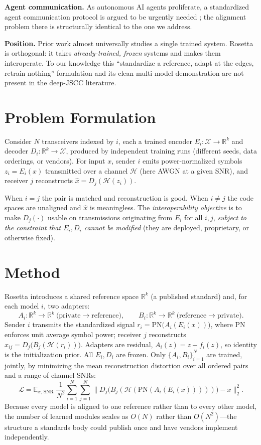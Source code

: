 \documentclass[11pt]{article}
\begin{document}
\textbf{Agent communication.} As autonomous AI agents proliferate, a standardized
agent communication protocol is argued to be urgently needed \cite{lacp2025}; the
alignment problem there is structurally identical to the one we address.

\textbf{Position.} Prior work almost universally studies a single trained system.
Rosetta is orthogonal: it takes \emph{already-trained, frozen} systems and makes them
interoperate. To our knowledge this ``standardize a reference, adapt at the edges,
retrain nothing'' formulation and its clean multi-model demonstration are not present
in the deep-JSCC literature.

\section{Problem Formulation}
Consider $N$ transceivers indexed by $i$, each a trained encoder $E_i:\mathcal{X}\to
\mathbb{R}^{k}$ and decoder $D_i:\mathbb{R}^{k}\to\mathcal{X}$, produced by independent
training runs (different seeds, data orderings, or vendors). For input $x$, sender $i$
emits power-normalized symbols $z_i=E_i(x)$ transmitted over a channel $\mathcal{H}$
(here AWGN at a given SNR), and receiver $j$ reconstructs $\hat{x}=D_j(\mathcal{H}(z_i))$.

When $i=j$ the pair is matched and reconstruction is good. When $i\neq j$ the code
spaces are unaligned and $\hat{x}$ is meaningless. The \emph{interoperability
objective} is to make $D_j(\cdot)$ usable on transmissions originating from $E_i$ for
all $i,j$, \emph{subject to the constraint that $E_i,D_i$ cannot be modified} (they are
deployed, proprietary, or otherwise fixed).

\section{Method}
Rosetta introduces a shared reference space $\mathbb{R}^{k}$ (a published standard) and,
for each model $i$, two adapters:
\[
  A_i:\mathbb{R}^{k}\!\to\!\mathbb{R}^{k}\ \text{(private}\to\text{reference)},\qquad
  B_i:\mathbb{R}^{k}\!\to\!\mathbb{R}^{k}\ \text{(reference}\to\text{private)}.
\]
Sender $i$ transmits the standardized signal $r_i=\mathrm{PN}\!\big(A_i(E_i(x))\big)$,
where $\mathrm{PN}$ enforces unit average symbol power; receiver $j$ reconstructs
$\hat{x}_{ij}=D_j\!\big(B_j(\mathcal{H}(r_i))\big)$. Adapters are residual,
$A_i(z)=z+f_i(z)$, so identity is the initialization prior. All $E_i,D_i$ are frozen.
Only $\{A_i,B_i\}_{i=1}^N$ are trained, jointly, by minimizing the mean reconstruction
distortion over all ordered pairs and a range of channel SNRs:
\[
  \mathcal{L}=\mathbb{E}_{x,\,\mathrm{SNR}}\;\frac{1}{N^2}\sum_{i=1}^{N}\sum_{j=1}^{N}
  \big\| D_j\!\big(B_j(\mathcal{H}(\mathrm{PN}(A_i(E_i(x)))))\big)-x\big\|_2^2 .
\]
Because every model is aligned to one reference rather than to every other model, the
number of learned modules scales as $O(N)$ rather than $O(N^2)$---the structure a
standards body could publish once and have vendors implement independently.
\end{document}
